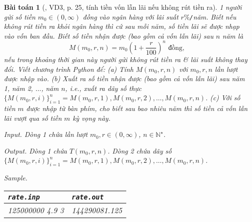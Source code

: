 \documentclass{article}
\newtheorem{baitoan}{Bài toán}
\begin{document}
\begin{baitoan}[\cite{CDHT_Toan_10_CD}, VD3, p. 25, tính tiền vốn lẫn lãi nếu không rút tiền ra]
	1 người gửi số tiền $m_0\in(0,\infty)$ đồng vào ngân hàng với lãi suất $r\%${\tt/}năm. Biết nếu không rút tiền ra khỏi ngân hàng thì cứ sau mỗi năm, số tiền lãi sẽ được nhạp vào vốn ban đầu. Biết số tiền nhận được (bao gồm cả vốn lẫn lãi) sau $n$ năm là
	\begin{equation*}
		M(m_0,r,n) = m_0\left(1 + \frac{r}{100}\right)^n\mbox{ đồng},
	\end{equation*}
	nếu trong khoảng thời gian này người gửi không rút tiền ra \& lãi suất không thay đổi. Viết chương trình Python để: (a) Tính $M(m_0,r,n)$ với $m_0,r,n$ lần lượt được nhập vào. (b) Xuất ra số tiền nhận được (bao gồm cả vốn lẫn lãi) sau năm 1, năm 2, $\ldots$, năm $n$, i.e., xuất ra dãy số thực $\{M(m_0,r,i)\}_{i=1}^n = M(m_0,r,1),M(m_0,r,2),\ldots,M(m_0,r,n)$. (c) Với số tiền $m$ được nhập từ bàn phím, cho biết sau bao nhiêu năm thì số tiền cả vốn lẫn lãi vượt qua số tiền $m$ kỳ vọng này.
	\item {\sf Input.} Dòng 1 chứa lần lượt $m_0,r\in(0,\infty)$, $n\in\mathbb{N}^\star$.
	\item {\sf Output.} Dòng 1 chứa $T(m_0,r,n)$. Dòng 2 chứa dãy số $\{M(m_0,r,i)\}_{i=1}^n = M(m_0,r,1),M(m_0,r,2),\ldots,M(m_0,r,n)$.
	\item {\sf Sample.}
	\begin{table}[H]
		\centering
		\begin{tabular}{|l|l|}
			\hline
			{\tt rate.inp} & {\tt rate.out} \\
			\hline
			125000000 4.9 3 & 144290081.125 \\
			\hline
		\end{tabular}
	\end{table}
\end{baitoan}
\end{document}
